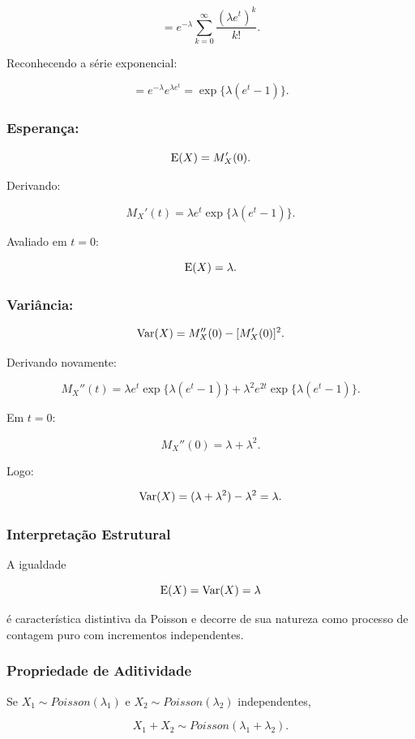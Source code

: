 \[
=
e^{-\lambda}
\sum_{k=0}^{\infty}
\frac{(\lambda e^t)^k}{k!}.
\]

Reconhecendo a série exponencial:

\[
=
e^{-\lambda}
e^{\lambda e^t}
=
\exp\{\lambda(e^t-1)\}.
\]

\subsubsection{Esperança:}

\[
\operatorname{E}(X)
=
M_X'(0).
\]

Derivando:

\[
M_X'(t)
=
\lambda e^t
\exp\{\lambda(e^t-1)\}.
\]

Avaliado em $t=0$:

\[
\operatorname{E}(X)
=
\lambda.
\]

\subsubsection{Variância:}

\[
\operatorname{Var}(X)
=
M_X''(0) - [M_X'(0)]^2.
\]

Derivando novamente:

\[
M_X''(t)
=
\lambda e^t \exp\{\lambda(e^t-1)\}
+
\lambda^2 e^{2t}
\exp\{\lambda(e^t-1)\}.
\]

Em $t=0$:

\[
M_X''(0)
=
\lambda + \lambda^2.
\]

Logo:

\[
\operatorname{Var}(X)
=
(\lambda + \lambda^2) - \lambda^2
=
\lambda.
\]

\subsubsection{Interpretação Estrutural}

A igualdade

\[
\operatorname{E}(X)=\operatorname{Var}(X)=\lambda
\]

é característica distintiva da Poisson e decorre de sua
natureza como processo de contagem puro com incrementos independentes.

\subsubsection{Propriedade de Aditividade}

Se $X_1\sim Poisson(\lambda_1)$ e
$X_2\sim Poisson(\lambda_2)$ independentes,

\[
X_1+X_2 \sim Poisson(\lambda_1+\lambda_2).
\]

